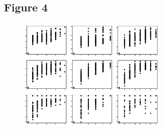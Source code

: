 \documentclass[12pt]{article}
\begin{document}
\newpage

\subsection*{Figure 4}

\begin{figure}[ht!]
	\centering\includegraphics[width=0.65\textwidth]{BetaTopoDist.pdf}
\end{figure}

\newpage
\end{document}

